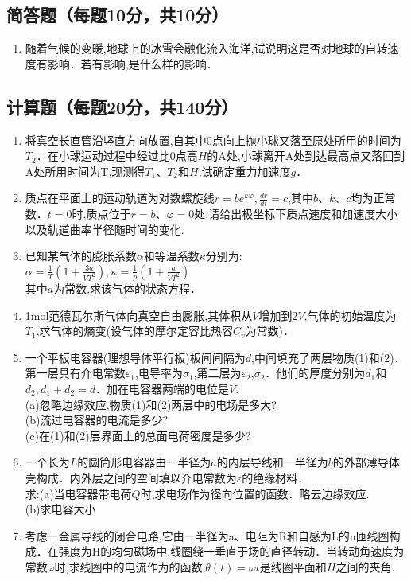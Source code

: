 
\subsection{简答题（每题10分，共10分）}
\begin{enumerate}
\item 随着气候的变暖,地球上的冰雪会融化流入海洋,试说明这是否对地球的自转速度有影响．若有影响,是什么样的影响．
\end{enumerate}
\subsection{计算题（每题20分，共140分）}
\begin{enumerate}
\item 将真空长直管沿竖直方向放置,自其中0点向上抛小球又落至原处所用的时间为$T_2$．在小球运动过程中经过比0点高$H$的$\mathrm A$处,小球离开$\mathrm A$处到达最高点又落回到$\mathrm A$处所用时间为T,现测得$T_1$、$T_2$和$H$,试确定重力加速度$g$．
\item 质点在平面上的运动轨道为对数螺旋线$r=be^{k\varphi},\frac{dr}{dt}=c$,其中$b$、$k$、$c$均为正常数．$t=0$时,质点位于$r=b$、$\varphi=0$处,请给出极坐标下质点速度和加速度大小以及轨道曲率半径随时间的变化.
\item 已知某气体的膨胀系数$\alpha$和等温系数$\kappa$分别为:\\
$\alpha=\frac{1}{T}(1+\frac{3a}{VT^2}),\kappa=\frac{1}{p}(1+\frac{a}{VT^2})$\\
其中$a$为常数,求该气体的状态方程．

\item 1mol范德瓦尔斯气体向真空自由膨胀,其体积从$V$增加到2$V$,气体的初始温度为$T_1$,求气体的熵变(设气体的摩尔定容比热容$C_v$为常数)．
\item 一个平板电容器(理想导体平行板)板间间隔为$d$,中间填充了两层物质(1)和(2)．第一层具有介电常数$\varepsilon_1$,电导率为$\sigma_1$,第二层为$\varepsilon_2$,$\sigma_2$．他们的厚度分别为$d_1$和$d_2,d_1+d_2=d$．加在电容器两端的电位是$V$.\\
(a)忽略边缘效应,物质(1)和(2)两层中的电场是多大?\\
(b)流过电容器的电流是多少?\\
(c)在(1)和(2)层界面上的总面电荷密度是多少?\\
\item 一个长为$L$的圆筒形电容器由一半径为$a$的内层导线和一半径为$b$的外部薄导体壳构成．内外层之间的空间填以介电常数为$\varepsilon$的绝缘材料．\\
求:(a)当电容器带电荷$Q$时,求电场作为径向位置的函数．略去边缘效应.\\
(b)求电容大小
\item 考虑一金属导线的闭合电路,它由一半径为a、电阻为R和自感为L的n匝线圈构成．在强度为H的均匀磁场中,线圈绕一垂直于场的直径转动．当转动角速度为常数$\omega$时,求线圈中的电流作为的函数,$\theta (t)=\omega t$是线圈平面和$H$之间的夹角.

\end{enumerate}